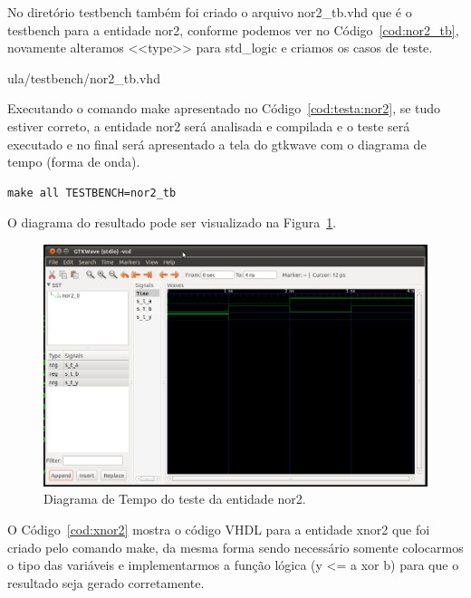 \documentclass[a4paper,11pt]{report}
\begin{document}
\lstset{language=VHDL}
\lstset{numbers=left, numberstyle=\tiny, stepnumber=1, numbersep=3pt}


No diretório testbench também foi criado o arquivo nor2\_tb.vhd que é o testbench para a entidade nor2, conforme podemos ver no Código~\ref{cod:nor2_tb}, novamente alteramos <<type>> para std\_logic e criamos os casos de teste.

\lstset{language=VHDL}
\lstset{numbers=left, numberstyle=\tiny, stepnumber=1, numbersep=3pt}
 {ula/testbench/nor2_tb.vhd}

Executando o comando make apresentado no Código~\ref{cod:testa:nor2}, se tudo estiver correto, a entidade nor2 será analisada e compilada e o teste será executado e no final será apresentado a tela do gtkwave com o diagrama de tempo (forma de onda).

\lstset{numbers=left, numberstyle=\tiny, stepnumber=1, numbersep=3pt}
\begin{lstlisting}[label=cod:testa:nor2,caption=Comando para executar o testbench da entidade nor2.]
  make all TESTBENCH=nor2_tb
\end{lstlisting}

O diagrama do resultado pode ser visualizado na Figura~\ref{fig:gtw:nor2}.

\begin{figure}[H]
\centering
\includegraphics[width=1\textwidth]{figuras/gtw_nor2.png}
\caption{Diagrama de Tempo do teste da entidade nor2.}
\label{fig:gtw:nor2}
\end{figure}

O Código~\ref{cod:xnor2} mostra o código VHDL para a entidade xnor2 que foi criado pelo comando make, da mesma forma sendo necessário somente colocarmos o tipo das variáveis e implementarmos a função lógica (y <= a xor b) para que o resultado seja gerado corretamente.
\end{document}
